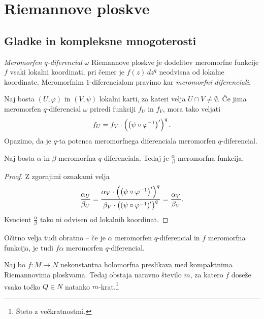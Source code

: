 \section{Riemannove ploskve}

\subsection{Gladke in kompleksne mnogoterosti}




\begin{definicija}
\emph{Meromorfen $q$-diferencial} $\omega$ Riemannove ploskve je
dodelitev meromorfne funkcije $f$ vsaki lokalni koordinati, pri
čemer je $f(z)\,dz^q$ neodvisna od lokalne koordinate. Meromorfnim
$1$-diferencialom pravimo kar \emph{meromorfni diferenciali}.
\end{definicija}

Naj bosta $(U, \varphi)$ in $(V, \psi)$ lokalni karti, za kateri
velja $U \cap V \ne \emptyset$. Če jima meromorfen $q$-diferencial
$\omega$ priredi funkciji $f_U$ in $f_V$, mora tako veljati
\[
f_U = f_V \cdot \left(\left(\psi \circ \varphi^{-1}\right)'\right)^q.
\]
Opazimo, da je $q$-ta potenca meromorfnega diferenciala meromorfen
$q$-diferencial.

\begin{trditev}
Naj bosta $\alpha$ in $\beta$ meromorfna $q$-diferenciala. Tedaj je
$\frac{\alpha}{\beta}$ meromorfna funkcija.
\end{trditev}

\begin{proof}
Z zgornjimi oznakami velja
\[
\frac{\alpha_U}{\beta_U} =
\frac{\alpha_V \cdot \left(\left(\psi \circ \varphi^{-1}\right)'\right)^q}
{\beta_V \cdot \left(\left(\psi \circ \varphi^{-1}\right)'\right)^q} =
\frac{\alpha_V}{\beta_V}.
\]
Kvocient $\frac{\alpha}{\beta}$ tako ni odvisen od lokalnih
koordinat.
\end{proof}

Očitno velja tudi obratno -- če je $\alpha$ meromorfen
$q$-diferencial in $f$ meromorfna funkcija, je tudi $f \alpha$
meromorfen $q$-diferencial.

\begin{trditev}
\label{td:deg}
Naj bo $f \colon M \to N$ nekonstantna holomorfna preslikava med
kompaktnima Riemannovima ploskvama. Tedaj obstaja naravno število
$m$, za katero $f$ doseže vsako točko $Q \in N$ natanko
$m$-krat.\footnote{Šteto z večkratnostmi.}
\end{trditev}

